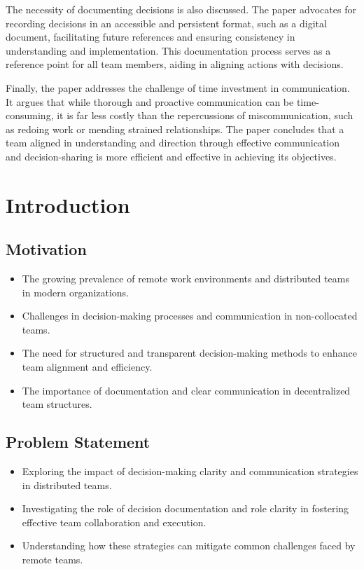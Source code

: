 \documentclass[12pt]{article}
\begin{document}
The necessity of documenting decisions is also discussed. The paper advocates for recording decisions in an accessible and persistent format, such as a digital document, facilitating future references and ensuring consistency in understanding and implementation. This documentation process serves as a reference point for all team members, aiding in aligning actions with decisions.

Finally, the paper addresses the challenge of time investment in communication. It argues that while thorough and proactive communication can be time-consuming, it is far less costly than the repercussions of miscommunication, such as redoing work or mending strained relationships. The paper concludes that a team aligned in understanding and direction through effective communication and decision-sharing is more efficient and effective in achieving its objectives.

\newpage

\section{Introduction}

\subsection{Motivation}
\begin{itemize}
  \item The growing prevalence of remote work environments and distributed teams in modern organizations.
  \item Challenges in decision-making processes and communication in non-collocated teams.
  \item The need for structured and transparent decision-making methods to enhance team alignment and efficiency.
  \item The importance of documentation and clear communication in decentralized team structures.
\end{itemize}

\subsection{Problem Statement}
\begin{itemize}
  \item Exploring the impact of decision-making clarity and communication strategies in distributed teams.
  \item Investigating the role of decision documentation and role clarity in fostering effective team collaboration and execution.
  \item Understanding how these strategies can mitigate common challenges faced by remote teams.
\end{itemize}
\end{document}
